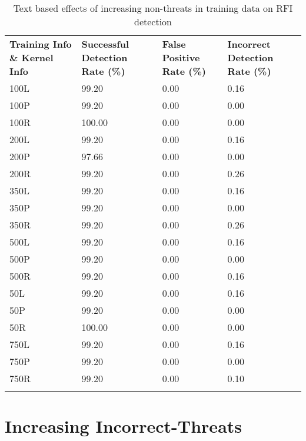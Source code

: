 \begin{appendices}
\begin{longtable}{|p{1.5in}|p{1in}|p{1in}|p{1in}|}
	\hline
	\textbf{Training Info \& Kernel Info} & \textbf{Successful Detection Rate (\%)} & \textbf{False Positive Rate (\%)} & \textbf{Incorrect Detection Rate (\%)}  \\
	\hhline{|=|=|=|=|}
	100L &  99.20 &  0.00 &  0.16 \\ \hline
	100P &  99.20 &  0.00 &  0.00 \\ \hline
	100R & 100.00 &  0.00 &  0.00 \\ \hline
	200L &  99.20 &  0.00 &  0.16 \\ \hline
	200P &  97.66 &  0.00 &  0.00 \\ \hline
	200R &  99.20 &  0.00 &  0.26 \\ \hline
	350L &  99.20 &  0.00 &  0.16 \\ \hline
	350P &  99.20 &  0.00 &  0.00 \\ \hline
	350R &  99.20 &  0.00 &  0.26 \\ \hline
	500L &  99.20 &  0.00 &  0.16 \\ \hline
	500P &  99.20 &  0.00 &  0.00 \\ \hline
	500R &  99.20 &  0.00 &  0.16 \\ \hline
 	50L &  99.20 &  0.00 &  0.16 \\ \hline
 	50P &  99.20 &  0.00 &  0.00 \\ \hline
 	50R & 100.00 &  0.00 &  0.00 \\ \hline
	750L &  99.20 &  0.00 &  0.16 \\ \hline
	750P &  99.20 &  0.00 &  0.00 \\ \hline
	750R &  99.20 &  0.00 &  0.10 \\ \hline
	\caption[]{Text based effects of increasing non-threats in training data on RFI detection}
	\label{app:rfiNonThreatText}
\end{longtable}

\newpage
\section{Increasing Incorrect-Threats}


\end{appendices}
